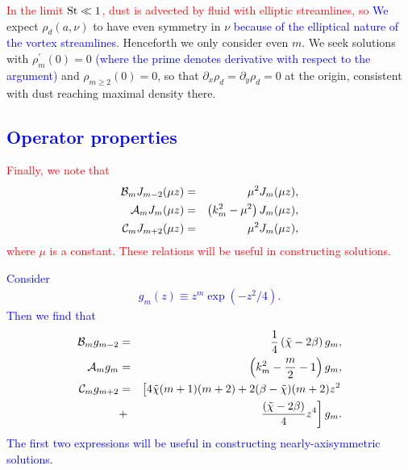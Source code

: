 \documentclass[apj]{emulateapj}
\def\blue#1{\textcolor{blue}{#1}}
\def\red#1{\textcolor{red}{#1}}
\newcommand{\beqn}{\begin{eqnarray}}
\newcommand{\eeqn}{\end{eqnarray}}
\newcommand{\tilchi}{\tilde\chi}
\newcommand{\St}{{\rm St}}
\begin{document}
\red{In the limit $\St\ll 1$, dust is advected by fluid with elliptic
streamlines, so} \blue{We} expect $\rho_d(a,\nu)$ to have even symmetry in
$\nu$ \blue{because of the elliptical nature of the vortex streamlines}. 
Henceforth we only consider even $m$. We seek solutions with  
$\rho_m^\prime(0)=0$ \blue{(where the prime denotes derivative with respect to the argument)} and $\rho_{m\geq2}(0)=0$, so that
$\partial_x\rho_d=\partial_y\rho_d=0$ at the origin, consistent with 
dust reaching maximal density there.  

\blue{\subsection{Operator properties}}

\red{
Finally, we note that
\beqn\label{eq:ops2}
\mathcal{B}_mJ_{m-2}(\mu z) &=& \mu^2J_m(\mu z),\notag\\
\mathcal{A}_mJ_m(\mu z) &=& \left(k_m^2 - \mu^2\right)J_m(\mu z),\notag\\
\mathcal{C}_mJ_{m+2}(\mu z) &= & \mu^2J_m(\mu z),\notag
\eeqn
where $\mu$ is a constant. These relations will be useful in
constructing solutions.}

\blue{
Consider 
\begin{align}
	g_m(z) \equiv z^m\exp{(-z^2/4)}.
\end{align}
Then we find that 
\beqn
\mathcal{B}_mg_{m-2} &=&\frac{1}{4}\left(\tilchi - 2\beta\right)g_m,\\
\mathcal{A}_mg_m &=& \left(k_m^2 - \frac{m}{2} - 1\right)g_m,\\
\mathcal{C}_mg_{m+2}&=& \left[4\tilchi(m+1)(m+2) +2(\beta-\tilchi)(m+2)z^2 \right.
\notag\\ &+&\left. \frac{\left(\tilchi - 2\beta\right)}{4}z^4\right]g_m. 
\eeqn
The first two expressions will be useful in constructing nearly-axisymmetric solutions. 
}
\end{document}
